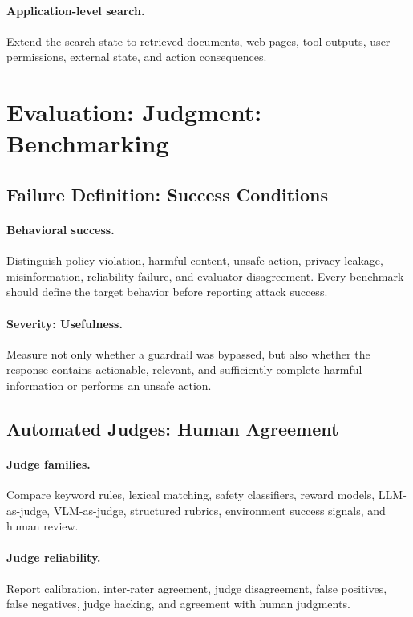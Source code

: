 \paragraph{Application-level search.}
Extend the search state to retrieved documents, web pages, tool outputs, user permissions, external state, and action consequences.

\section{Evaluation: Judgment: Benchmarking}
\label{sec:evaluation}

\subsection{Failure Definition: Success Conditions}

\paragraph{Behavioral success.}
Distinguish policy violation, harmful content, unsafe action, privacy leakage, misinformation, reliability failure, and evaluator disagreement. Every benchmark should define the target behavior before reporting attack success.

\paragraph{Severity: Usefulness.}
Measure not only whether a guardrail was bypassed, but also whether the response contains actionable, relevant, and sufficiently complete harmful information or performs an unsafe action.

\subsection{Automated Judges: Human Agreement}

\paragraph{Judge families.}
Compare keyword rules, lexical matching, safety classifiers, reward models, LLM-as-judge, VLM-as-judge, structured rubrics, environment success signals, and human review.

\paragraph{Judge reliability.}
Report calibration, inter-rater agreement, judge disagreement, false positives, false negatives, judge hacking, and agreement with human judgments.

